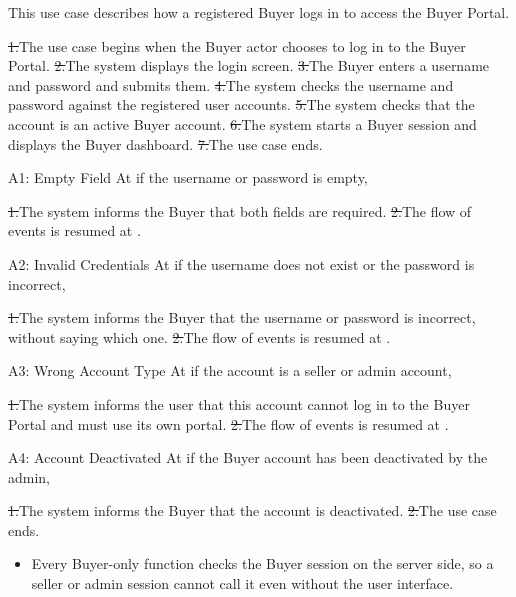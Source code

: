 This use case describes how a registered Buyer logs in to access the Buyer Portal.\par
{}
\st{1.}{The use case begins when the Buyer actor chooses to log in to the Buyer Portal.}
\st{2.}{The system displays the login screen.}
\st{3.}{The Buyer enters a username and password and submits them.}
\st{4.}{The system checks the username and password against the registered user accounts.}
\st{5.}{The system checks that the account is an active Buyer account.}
\st{6.}{The system starts a Buyer session and displays the Buyer dashboard.}
\st{7.}{The use case ends.}
\begin{flowblock}{A1: Empty Field}
At  if the username or password is empty,\par
\st{1.}{The system informs the Buyer that both fields are required.}
\st{2.}{The flow of events is resumed at .}
\end{flowblock}
\begin{flowblock}{A2: Invalid Credentials}
At  if the username does not exist or the password is incorrect,\par
\st{1.}{The system informs the Buyer that the username or password is incorrect, without saying which one.}
\st{2.}{The flow of events is resumed at .}
\end{flowblock}
\begin{flowblock}{A3: Wrong Account Type}
At  if the account is a seller or admin account,\par
\st{1.}{The system informs the user that this account cannot log in to the Buyer Portal and must use its own portal.}
\st{2.}{The flow of events is resumed at .}
\end{flowblock}
\begin{flowblock}{A4: Account Deactivated}
At  if the Buyer account has been deactivated by the admin,\par
\st{1.}{The system informs the Buyer that the account is deactivated.}
\st{2.}{The use case ends.}
\end{flowblock}
\begin{itemize}
  \item Every Buyer-only function checks the Buyer session on the server side, so a seller or admin session cannot call it even without the user interface.
\end{itemize}

